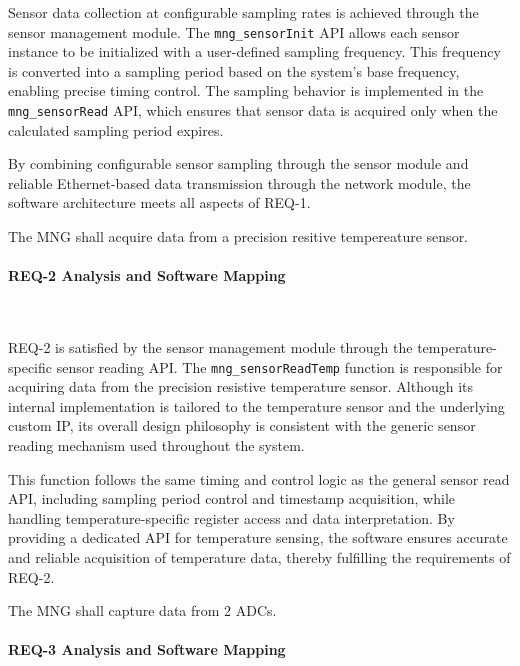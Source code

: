Sensor data collection at configurable sampling rates is achieved through the sensor 
management module. The \texttt{mng\_sensorInit} API allows each sensor instance to be 
initialized with a user-defined sampling frequency. This frequency is converted into
a sampling period based on the system’s base frequency, enabling precise timing 
control. The sampling behavior is implemented in the \texttt{mng\_sensorRead} API, which 
ensures that sensor data is acquired only when the calculated sampling period 
expires.

By combining configurable sensor sampling through the sensor module and reliable 
Ethernet-based data transmission through the network module, the software 
architecture meets all aspects of REQ-1.


\begin{tcolorbox}[
    title=REQ-2,
    colback=gray!5,
    colframe=black,
    fonttitle=\bfseries
]
The MNG shall acquire data from a precision resitive tempereature sensor.
\end{tcolorbox}

\paragraph{REQ-2 Analysis and Software Mapping}\

REQ-2 is satisfied by the sensor management module through the temperature-specific 
sensor reading API. The \texttt{mng\_sensorReadTemp} function is responsible for acquiring 
data from the precision resistive temperature sensor. Although its internal 
implementation is tailored to the temperature sensor and the underlying custom IP, 
its overall design philosophy is consistent with the generic sensor reading mechanism 
used throughout the system.

This function follows the same timing and control logic as the general sensor read 
API, including sampling period control and timestamp acquisition, while handling 
temperature-specific register access and data interpretation. By providing a 
dedicated API for temperature sensing, the software ensures accurate and reliable 
acquisition of temperature data, thereby fulfilling the requirements of REQ-2.

\begin{tcolorbox}[
    title=REQ-3,
    colback=gray!5,
    colframe=black,
    fonttitle=\bfseries
]
The MNG shall capture data from 2 ADCs.
\end{tcolorbox}

\paragraph{REQ-3 Analysis and Software Mapping}\

